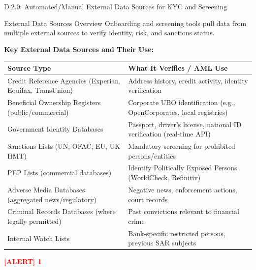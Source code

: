\documentclass[11pt,a4paper]{beamer}
\newcommand{\redflag}[1]{\textcolor{red}{\textbf{[ALERT] 1}}}
\begin{document}
\begin{frame}{D.2.0: Automated/Manual External Data Sources for KYC and Screening}
	\begin{block}{External Data Sources Overview}
		Onboarding and screening tools pull data from multiple external sources to verify identity, risk, and sanctions status.
	\end{block}
	\textbf{Key External Data Sources and Their Use:}
	\begin{tabular}{p{}|p{}}
		\hline
		\rowcolor{lightgray}
		\textbf{Source Type} & \textbf{What It Verifies / AML Use} \\
		\hline
		Credit Reference Agencies (Experian, Equifax, TransUnion) & Address history, credit activity, identity verification \\
		\hline
		Beneficial Ownership Registers (public/commercial) & Corporate UBO identification (e.g., OpenCorporates, local registries) \\
		\hline
		Government Identity Databases & Passport, driver's license, national ID verification (real-time API) \\
		\hline
		Sanctions Lists (UN, OFAC, EU, UK HMT) & Mandatory screening for prohibited persons/entities \\
		\hline
		PEP Lists (commercial databases) & Identify Politically Exposed Persons (WorldCheck, Refinitiv) \\
		\hline
		Adverse Media Databases (aggregated news/regulatory) & Negative news, enforcement actions, court records \\
		\hline
		Criminal Records Databases (where legally permitted) & Past convictions relevant to financial crime \\
		\hline
		Internal Watch Lists & Bank-specific restricted persons, previous SAR subjects \\
		\hline
	\end{tabular}
	\redflag{No single source is sufficient. Triangulation across multiple sources is required.}
\end{frame}
\end{document}
